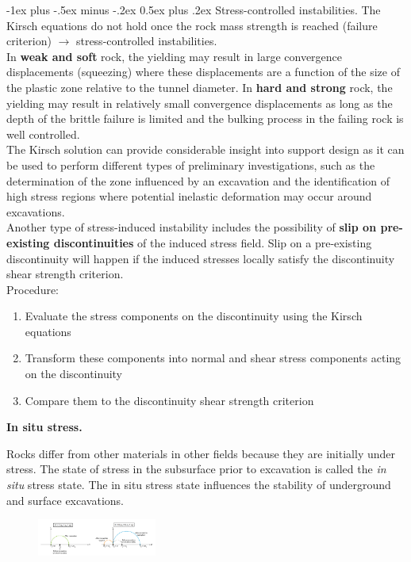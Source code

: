 \documentclass[10pt,landscape,a4paper]{article}
\makeatletter
\newcounter{Chapcounter}
\newcommand{\chapter}[1]{{\addtocounter{Chapcounter}{1}\fontsize{17}{16}\textbf{#1}}}
\renewcommand{\section}{\@startsection{section}{1}{0mm}%
	{-1ex plus -.5ex minus -.2ex}%
	{0.5ex plus .2ex}%
	{\normalfont\large\bfseries}}
\makeatother
\begin{document}
\begin{multicols}{3}
		\section{Stress-controlled instabilities.}
		The Kirsch equations do not hold once the rock mass strength is reached (failure criterion) $\to$ stress-controlled instabilities.\\
		In \textbf{weak and soft} rock, the yielding may result in large convergence displacements (squeezing) where these displacements are a function of the size of the plastic zone relative to the tunnel diameter.
		In \textbf{hard and strong} rock, the yielding may result in relatively small convergence displacements as long as the depth of the brittle failure is limited and the bulking process in the failing rock is well controlled.\\
		The Kirsch solution can provide considerable insight into support design as it can be used to perform different types of preliminary investigations, such as  the determination of the zone influenced by an excavation and the identification of high stress regions where potential inelastic deformation may occur around excavations.\\
		Another type of stress-induced instability includes the possibility of \textbf{slip on pre-existing discontinuities} of the induced stress field.
		Slip on a pre-existing discontinuity will happen if the induced stresses locally satisfy the discontinuity shear strength criterion.\\
		Procedure:
		\begin{enumerate}
			\item Evaluate the stress components on the discontinuity using the Kirsch equations
			\item Transform these components into normal and shear stress components acting on the discontinuity
			\item Compare them to the discontinuity shear strength criterion
		\end{enumerate}
		
		\chapter{In situ stress.}
		
		Rocks differ from other materials in other fields because they are initially under stress.
		The state of stress in the subsurface prior to excavation is called the \textit{in situ} stress state.
		The in situ stress state influences the stability of underground and surface excavations.
		\begin{figure}[H]
			\centering
			\includegraphics[width=0.35\textwidth]{in-situ}
		\end{figure}
		

\end{multicols}
\end{document}
